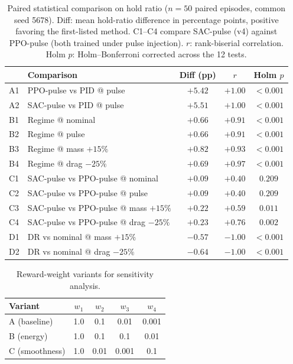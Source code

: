 \documentclass[conference]{IEEEtran}
\begin{document}
\begin{table}[t]
\centering
\caption{Paired statistical comparison on hold ratio ($n{=}50$ paired episodes, common seed 5678). Diff: mean hold-ratio difference in percentage points, positive favoring the first-listed method. C1--C4 compare SAC-pulse (v4) against PPO-pulse (both trained under pulse injection). $r$: rank-biserial correlation. Holm $p$: Holm--Bonferroni corrected across the 12 tests.}
\label{tab:stats}
\begin{tabular}{@{}llccc@{}}
\toprule
 & \textbf{Comparison} & \textbf{Diff (pp)} & $r$ & \textbf{Holm $p$} \\
\midrule
A1 & PPO-pulse vs PID @ pulse     & $+5.42$ & $+1.00$ & $<0.001$ \\
A2 & SAC-pulse vs PID @ pulse     & $+5.51$ & $+1.00$ & $<0.001$ \\
\midrule
B1 & Regime @ nominal             & $+0.66$ & $+0.91$ & $<0.001$ \\
B2 & Regime @ pulse               & $+0.66$ & $+0.91$ & $<0.001$ \\
B3 & Regime @ mass $+15\%$        & $+0.82$ & $+0.93$ & $<0.001$ \\
B4 & Regime @ drag $-25\%$        & $+0.69$ & $+0.97$ & $<0.001$ \\
\midrule
C1 & SAC-pulse vs PPO-pulse @ nominal         & $+0.09$ & $+0.40$ & $0.209$ \\
C2 & SAC-pulse vs PPO-pulse @ pulse           & $+0.09$ & $+0.40$ & $0.209$ \\
C3 & SAC-pulse vs PPO-pulse @ mass $+15\%$    & $+0.22$ & $+0.59$ & $0.011$ \\
C4 & SAC-pulse vs PPO-pulse @ drag $-25\%$    & $+0.23$ & $+0.76$ & $0.002$ \\
\midrule
D1 & DR vs nominal @ mass $+15\%$ & $-0.57$ & $-1.00$ & $<0.001$ \\
D2 & DR vs nominal @ drag $-25\%$ & $-0.64$ & $-1.00$ & $<0.001$ \\
\bottomrule
\end{tabular}
\end{table}

\begin{table}[t]
\centering
\caption{Reward-weight variants for sensitivity analysis.}
\label{tab:ablation}
\begin{tabular}{@{}lcccc@{}}
\toprule
Variant & $w_1$ & $w_2$ & $w_3$ & $w_4$ \\
\midrule
A (baseline)    & 1.0 & 0.1  & 0.01  & 0.001 \\
B (energy)      & 1.0 & 0.1  & 0.1   & 0.01  \\
C (smoothness)  & 1.0 & 0.01 & 0.001 & 0.1   \\
\bottomrule
\end{tabular}
\end{table}
\end{document}
